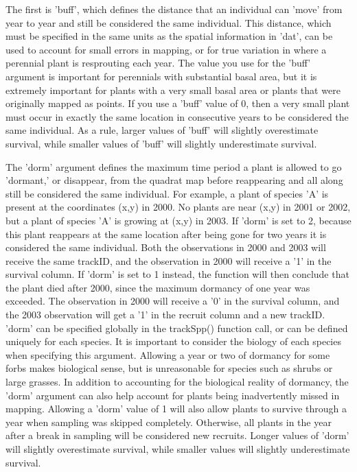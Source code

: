 \documentclass[12pt, letterpaper]{article}
\begin{document}
The first is 'buff', which defines the distance that an individual can 'move' from year to year and still be considered the same individual. This distance, which must be specified in the same units as the spatial information in 'dat', can be used to account for small errors in mapping, or for true variation in where a perennial plant is resprouting each year. The value you use for the 'buff' argument is important for perennials with substantial basal area, but it is extremely important for plants with a very small basal area or plants that were originally mapped as points. If you use a 'buff' value of 0, then a very small plant must occur in exactly the same location in consecutive years to be considered the same individual. As a rule, larger values of 'buff' will slightly overestimate survival, while smaller values of 'buff' will slightly underestimate survival.   

The 'dorm' argument defines the maximum time period a plant is allowed to go 'dormant,' or disappear, from the quadrat map before reappearing and all along still be considered the same individual. For example, a plant of species 'A' is present at the coordinates (x,y) in 2000. No plants are near (x,y) in 2001 or 2002, but a plant of species 'A' is growing at (x,y) in 2003. If 'dorm' is set to 2, because this plant reappears at the same location after being gone for two years it is considered the same individual. Both the observations in 2000 and 2003 will receive the same trackID, and the observation in 2000 will receive a '1' in the survival column. If 'dorm' is set to 1 instead, the function will then conclude that the plant died after 2000, since the maximum dormancy of one year was exceeded. The observation in 2000 will receive a '0' in the survival column, and the 2003 observation will get a '1' in the recruit column and a new trackID. 'dorm' can be specified globally in the trackSpp() function call, or can be defined uniquely for each species. It is important to consider the biology of each species when specifying this argument. Allowing a year or two of dormancy for some forbs makes biological sense, but is unreasonable for species such as shrubs or large grasses. In addition to accounting for the biological reality of dormancy, the 'dorm' argument can also help account for plants being inadvertently missed in mapping. Allowing a 'dorm' value of 1 will also allow plants to survive through a year when sampling was skipped completely. Otherwise, all plants in the year after a break in sampling will be considered new recruits. Longer values of 'dorm' will slightly overestimate survival, while smaller values will slightly underestimate survival. 
\end{document}

